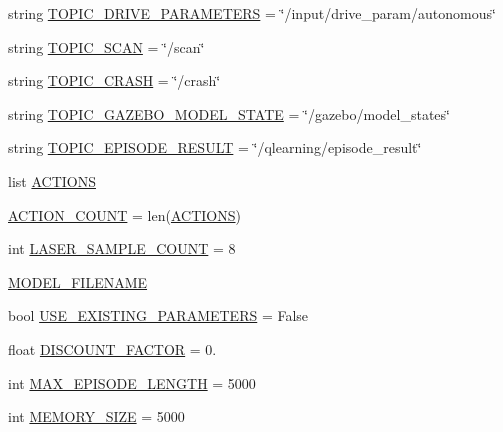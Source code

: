\begin{DoxyCompactItemize}
\item 
string \hyperlink{namespaceparameters_a855cb11de60782b8e9997af80bdab518}{T\+O\+P\+I\+C\+\_\+\+D\+R\+I\+V\+E\+\_\+\+P\+A\+R\+A\+M\+E\+T\+E\+RS} = \char`\"{}/input/drive\+\_\+param/autonomous\char`\"{}
\item 
string \hyperlink{namespaceparameters_a28de242cdbba10666eb0c95aaef6812b}{T\+O\+P\+I\+C\+\_\+\+S\+C\+AN} = \char`\"{}/scan\char`\"{}
\item 
string \hyperlink{namespaceparameters_a5e392ed4d998f10824bfd96a0eae2988}{T\+O\+P\+I\+C\+\_\+\+C\+R\+A\+SH} = \char`\"{}/crash\char`\"{}
\item 
string \hyperlink{namespaceparameters_a9d4157266ec0afde91ab7d58be4f688d}{T\+O\+P\+I\+C\+\_\+\+G\+A\+Z\+E\+B\+O\+\_\+\+M\+O\+D\+E\+L\+\_\+\+S\+T\+A\+TE} = \char`\"{}/gazebo/model\+\_\+states\char`\"{}
\item 
string \hyperlink{namespaceparameters_aa69db8cd2d598f0d10212ea8df6a2139}{T\+O\+P\+I\+C\+\_\+\+E\+P\+I\+S\+O\+D\+E\+\_\+\+R\+E\+S\+U\+LT} = \char`\"{}/qlearning/episode\+\_\+result\char`\"{}
\item 
list \hyperlink{namespaceparameters_a585a25d0a26bcab4242d2e3fb1c1f93e}{A\+C\+T\+I\+O\+NS}
\item 
\hyperlink{namespaceparameters_ae4be13f6dac91f471da3efb4618a54c1}{A\+C\+T\+I\+O\+N\+\_\+\+C\+O\+U\+NT} = len(\hyperlink{namespaceparameters_a585a25d0a26bcab4242d2e3fb1c1f93e}{A\+C\+T\+I\+O\+NS})
\item 
int \hyperlink{namespaceparameters_a24735dce78cf9899cf1ec4bda2ea4eac}{L\+A\+S\+E\+R\+\_\+\+S\+A\+M\+P\+L\+E\+\_\+\+C\+O\+U\+NT} = 8
\item 
\hyperlink{namespaceparameters_aff8b0668384f3fa2d1212d3bd0ff42fa}{M\+O\+D\+E\+L\+\_\+\+F\+I\+L\+E\+N\+A\+ME}
\item 
bool \hyperlink{namespaceparameters_a0cffcb215ac12a1700baedb1a13ec8d5}{U\+S\+E\+\_\+\+E\+X\+I\+S\+T\+I\+N\+G\+\_\+\+P\+A\+R\+A\+M\+E\+T\+E\+RS} = False
\item 
float \hyperlink{namespaceparameters_a70176024e0f585c846365800f1c7819c}{D\+I\+S\+C\+O\+U\+N\+T\+\_\+\+F\+A\+C\+T\+OR} = 0.
\item 
int \hyperlink{namespaceparameters_aa473cc3b100416af3310c6c5a6d19570}{M\+A\+X\+\_\+\+E\+P\+I\+S\+O\+D\+E\+\_\+\+L\+E\+N\+G\+TH} = 5000
\item 
int \hyperlink{namespaceparameters_a49f1ad074b5710a98fc783c5627ddade}{M\+E\+M\+O\+R\+Y\+\_\+\+S\+I\+ZE} = 5000
\item 

\end{DoxyCompactItemize}
